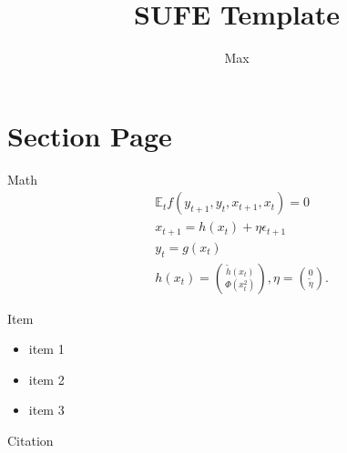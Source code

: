 \documentclass[aspectratio=169]{beamer}
\title{SUFE Template}
\author{Max}
\begin{document}
\section{Section Page}
\begin{frame}{Math}
    \begin{equation}
\begin{aligned}
& \mathbb{E}_t f\left(y_{t+1}, y_t, x_{t+1}, x_t\right)=0 \\
& x_{t+1}=h\left(x_t\right)+\eta \epsilon_{t+1} \\
& y_t=g\left(x_t\right) \\
& h\left(x_t\right)=\binom{\tilde{h}\left(x_t\right)}{\Phi\left(x_t^2\right)}, \eta=\binom{0}{\tilde{\eta}} .
\end{aligned}
\end{equation}
\end{frame}

\begin{frame}{Item}
    \begin{itemize}
        \item item 1
    \item item 2
    \item item 3
    \end{itemize}
\end{frame}

\begin{frame}{Citation}
    \\
\end{frame}
\end{document}
